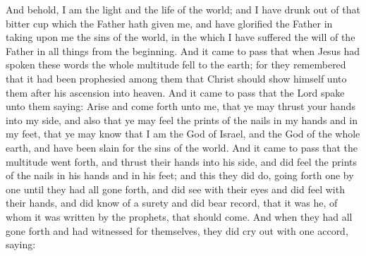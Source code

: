 And behold, I am the light and the life of the world; and I have drunk out of that bitter cup which the Father hath given me, and have glorified the Father in taking upon me the sins of the world, in the which I have suffered the will of the Father in all things from the beginning.
\bverse \iffalse And it came to pass that when Jesus had spoken these words the whole multitude fell to the earth; for they remembered that it had been prophesied among them that Christ should show himself unto them after his ascension into heaven. \fi
And it came to pass that when Jesus had spoken these words the whole multitude fell to the earth; for they remembered that it had been prophesied among them that Christ should show himself unto them after his ascension into heaven.
\bverse \iffalse And it came to pass that the Lord spake unto them saying: \fi
And it came to pass that the Lord spake unto them saying:
\bverse \iffalse Arise and come forth unto me, that ye may thrust your hands into my side, and also that ye may feel the prints of the nails in my hands and in my feet, that ye may know that I am the God of Israel, and the God of the whole earth, and have been slain for the sins of the world. \fi
Arise and come forth unto me, that ye may thrust your hands into my side, and also that ye may feel the prints of the nails in my hands and in my feet, that ye may know that I am the God of Israel, and the God of the whole earth, and have been slain for the sins of the world.
\bverse \iffalse And it came to pass that the multitude went forth, and thrust their hands into his side, and did feel the prints of the nails in his hands and in his feet; and this they did do, going forth one by one until they had all gone forth, and did see with their eyes and did feel with their hands, and did know of a surety and did bear record, that it was he, of whom it was written by the prophets, that should come. \fi
And it came to pass that the multitude went forth, and thrust their hands into his side, and did feel the prints of the nails in his hands and in his feet; and this they did do, going forth one by one until they had all gone forth, and did see with their eyes and did feel with their hands, and did know of a surety and did bear record, that it was he, of whom it was written by the prophets, that should come.
\bverse \iffalse And when they had all gone forth and had witnessed for themselves, they did cry out with one accord, saying: \fi
And when they had all gone forth and had witnessed for themselves, they did cry out with one accord, saying:
